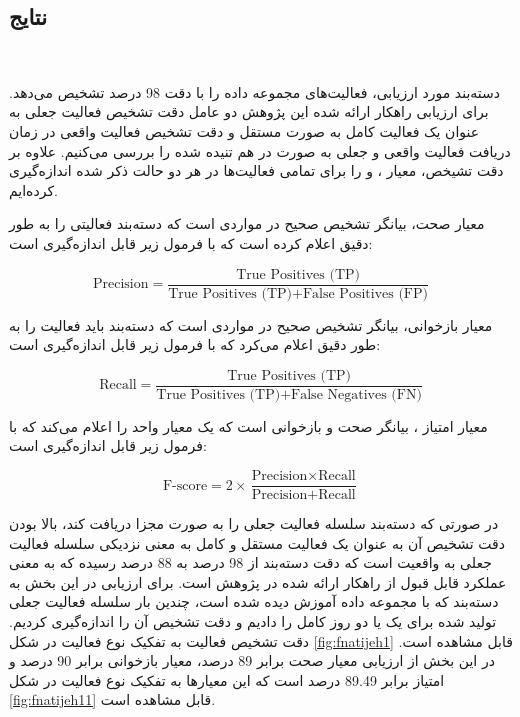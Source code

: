 \subsection{نتایج}‌

دسته‌بند مورد ارزیابی، فعالیت‌های مجموعه داده  را با دقت 98 درصد تشخیص می‌دهد. برای ارزیابی راهکار ارائه شده این پژوهش دو عامل دقت تشخیص فعالیت جعلی به عنوان یک فعالیت کامل به صورت مستقل و دقت تشخیص فعالیت واقعی در زمان دریافت فعالیت واقعی و جعلی به صورت در هم تنیده شده را بررسی می‌کنیم. علاوه بر دقت تشیخص، معیار ،  و  را برای تمامی فعالیت‌ها در هر دو حالت ذکر شده اندازه‌گیری کرده‌ایم. 

معیار صحت، بیانگر تشخیص صحیح در مواردی است که دسته‌بند فعالیتی را به طور دقیق اعلام کرده است که با فرمول زیر قابل اندازه‌گیری است:

\begin{equation}
\text{Precision} = \frac{\text{True Positives (TP)}}{\text{True Positives (TP)} + \text{False Positives (FP)}}
\end{equation}

معیار بازخوانی، بیانگر تشخیص صحیح در مواردی است که دسته‌بند باید فعالیت را به طور دقیق اعلام می‌کرد که با فرمول زیر قابل اندازه‌گیری است:

\begin{equation}
\text{Recall} = \frac{\text{True Positives (TP)}}{\text{True Positives (TP)} + \text{False Negatives (FN)}}
\end{equation}

معیار امتیاز ، بیانگر  صحت و بازخوانی است که یک معیار واحد را اعلام می‌کند که با فرمول زیر قابل اندازه‌گیری است:

\begin{equation}
\text{F-score} = 2 \times \frac{\text{Precision} \times \text{Recall}}{\text{Precision} + \text{Recall}}
\end{equation}

 در صورتی که دسته‌بند سلسله فعالیت جعلی را به صورت مجزا دریافت کند، بالا بودن دقت تشخیص آن به عنوان یک فعالیت مستقل و کامل به معنی نزدیکی سلسله فعالیت جعلی به واقعیت است که دقت دسته‌بند از 98 درصد به 88 درصد رسیده که به معنی عملکرد قابل قبول از راهکار ارائه شده در پژوهش است. برای ارزیابی در این بخش به دسته‌بند که با مجموعه داده  آموزش دیده شده است، چندین بار سلسله فعالیت جعلی تولید شده برای یک یا دو روز کامل را دادیم و دقت تشخیص آن را اندازه‌گیری کردیم. دقت تشخیص فعالیت به تفکیک نوع فعالیت در شکل \ref{fig:fnatijeh1} قابل مشاهده است. در این بخش از ارزیابی معیار صحت برابر 89 درصد، معیار بازخوانی برابر 90 درصد و امتیاز  برابر 89.49 درصد است که این معیارها به تفکیک نوع فعالیت در شکل \ref{fig:fnatijeh11} قابل مشاهده است.

